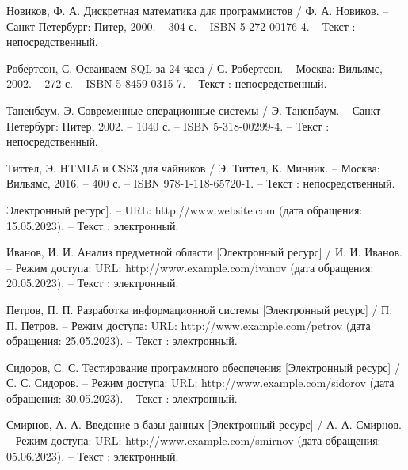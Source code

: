 \begin{thebibliography}{9}
    Новиков, Ф. А. Дискретная математика для программистов / Ф. А. Новиков. – Санкт-Петербург: Питер, 2000. – 304 с. – ISBN 5-272-00176-4. – Текст : непосредственный.
    
    Робертсон, С. Осваиваем SQL за 24 часа / С. Робертсон. – Москва: Вильямс, 2002. – 272 с. – ISBN 5-8459-0315-7. – Текст : непосредственный.
    
    Таненбаум, Э. Современные операционные системы / Э. Таненбаум. – Санкт-Петербург: Питер, 2002. – 1040 с. – ISBN 5-318-00299-4. – Текст : непосредственный.
    
    Титтел, Э. HTML5 и CSS3 для чайников / Э. Титтел, К. Минник. – Москва: Вильямс, 2016. – 400 с. – ISBN 978-1-118-65720-1. – Текст : непосредственный.
    
    Электронный ресурс]. – URL: http://www.website.com (дата обращения: 15.05.2023). – Текст : электронный.
    
    Иванов, И. И. Анализ предметной области [Электронный ресурс] / И. И. Иванов. – Режим доступа: URL: http://www.example.com/ivanov (дата обращения: 20.05.2023). – Текст : электронный.
    
    Петров, П. П. Разработка информационной системы [Электронный ресурс] / П. П. Петров. – Режим доступа: URL: http://www.example.com/petrov (дата обращения: 25.05.2023). – Текст : электронный.
    
    Сидоров, С. С. Тестирование программного обеспечения [Электронный ресурс] / С. С. Сидоров. – Режим доступа: URL: http://www.example.com/sidorov (дата обращения: 30.05.2023). – Текст : электронный.
    
    Смирнов, А. А. Введение в базы данных [Электронный ресурс] / А. А. Смирнов. – Режим доступа: URL: http://www.example.com/smirnov (дата обращения: 05.06.2023). – Текст : электронный.
\end{thebibliography}
